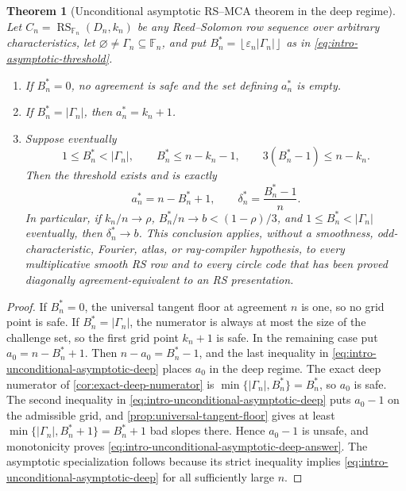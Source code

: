 \documentclass[12pt,a4paper]{amsart}
\numberwithin{equation}{section}
\newtheorem{theorem}{Theorem}[section]
\theoremstyle{remark}
\DeclareMathOperator{\RS}{RS}
\newcommand{\F}{\mathbb F}
\newcommand{\eps}{\varepsilon}
\newcommand{\abs}[1]{\lvert #1\rvert}
\newcommand{\floor}[1]{\left\lfloor #1\right\rfloor}
\begin{document}
\begin{theorem}[Unconditional asymptotic RS--MCA theorem in the deep regime]
\label{thm:intro-unconditional-asymptotic-deep}
Let \(C_n=\RS_{\F_n}(D_n,k_n)\) be any Reed--Solomon row sequence over
arbitrary characteristics, let
\(\varnothing\ne\Gamma_n\subseteq\F_n\), and put
\(B_n^*=\floor{\eps_n\abs{\Gamma_n}}\) as in
\eqref{eq:intro-asymptotic-threshold}.
\begin{enumerate}[label=\textup{(\roman*)},leftmargin=*]
\item If \(B_n^*=0\), no agreement is safe and the set defining
      \(a_n^*\) is empty.
\item If \(B_n^*=\abs{\Gamma_n}\), then \(a_n^*=k_n+1\).
\item Suppose eventually
\[
 1\le B_n^*<\abs{\Gamma_n},\qquad
 B_n^*\le n-k_n-1,\qquad
 3(B_n^*-1)\le n-k_n.                              \tag{1.3}
 \label{eq:intro-unconditional-asymptotic-deep}
\]
Then the threshold exists and is exactly
\[
 a_n^*=n-B_n^*+1,\qquad
 \delta_n^*=\frac{B_n^*-1}{n}.                    \tag{1.4}
 \label{eq:intro-unconditional-asymptotic-deep-answer}
\]
In particular, if \(k_n/n\to\rho\),
\(B_n^*/n\to b<(1-\rho)/3\), and
\(1\le B_n^*<\abs{\Gamma_n}\) eventually, then
\(\delta_n^*\to b\).  This conclusion applies, without a smoothness,
odd-characteristic, Fourier, atlas, or ray-compiler hypothesis, to every
multiplicative smooth RS row and to every circle code that has been proved
diagonally agreement-equivalent to an RS presentation.
\end{enumerate}
\end{theorem}

\begin{proof}
If \(B_n^*=0\), the universal tangent floor at agreement \(n\) is one,
so no grid point is safe.  If \(B_n^*=\abs{\Gamma_n}\), the numerator is
always at most the size of the challenge set, so the first grid point
\(k_n+1\) is safe.  In the remaining case put
\(a_0=n-B_n^*+1\).  Then \(n-a_0=B_n^*-1\), and the last inequality in
\eqref{eq:intro-unconditional-asymptotic-deep} places \(a_0\) in the
deep regime.  The exact deep numerator of
\cref{cor:exact-deep-numerator} is
\(\min\{\abs{\Gamma_n},B_n^*\}=B_n^*\), so \(a_0\) is safe.  The second
inequality in \eqref{eq:intro-unconditional-asymptotic-deep} puts
\(a_0-1\) on the admissible grid, and
\cref{prop:universal-tangent-floor} gives at least
\(\min\{\abs{\Gamma_n},B_n^*+1\}=B_n^*+1\) bad slopes there.  Hence
\(a_0-1\) is unsafe, and monotonicity proves
\eqref{eq:intro-unconditional-asymptotic-deep-answer}.  The asymptotic
specialization follows because its strict inequality implies
\eqref{eq:intro-unconditional-asymptotic-deep} for all sufficiently large
\(n\).
\end{proof}
\end{document}
